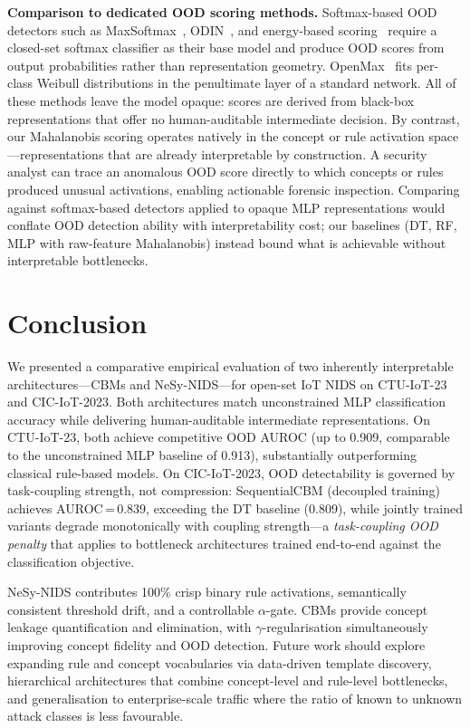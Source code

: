 \documentclass[journal]{IEEEtran}
\begin{document}
\textbf{Comparison to dedicated OOD scoring methods.}
Softmax-based OOD detectors such as
MaxSoftmax~\cite{hendrycks2017baseline}, ODIN~\cite{liang2018odin}, and
energy-based scoring~\cite{liu2020energy} require a closed-set softmax
classifier as their base model and produce OOD scores from output
probabilities rather than representation geometry. OpenMax~\cite{bendale2016openmax}
fits per-class Weibull distributions in the penultimate layer of a
standard network. All of these methods leave the model opaque: scores
are derived from black-box representations that offer no human-auditable
intermediate decision. By contrast, our Mahalanobis scoring operates
natively in the concept or rule activation space---representations that
are already interpretable by construction. A security analyst can trace
an anomalous OOD score directly to which concepts or rules produced
unusual activations, enabling actionable forensic inspection. Comparing
against softmax-based detectors applied to opaque MLP representations
would conflate OOD detection ability with interpretability cost; our
baselines (DT, RF, MLP with raw-feature Mahalanobis) instead bound
what is achievable without interpretable bottlenecks.

\section{Conclusion}

We presented a comparative empirical evaluation of two inherently
interpretable architectures---CBMs and NeSy-NIDS---for open-set IoT
NIDS on CTU-IoT-23 and CIC-IoT-2023. Both architectures match
unconstrained MLP classification accuracy while delivering
human-auditable intermediate representations. On CTU-IoT-23, both
achieve competitive OOD AUROC (up to 0.909, comparable to the
unconstrained MLP baseline of 0.913), substantially
outperforming classical rule-based models. On CIC-IoT-2023, OOD detectability is governed by task-coupling
strength, not compression: SequentialCBM (decoupled training) achieves
AUROC\,=\,0.839, exceeding the DT baseline (0.809), while jointly
trained variants degrade monotonically with coupling strength---a
\emph{task-coupling OOD penalty} that applies to bottleneck
architectures trained end-to-end against the classification objective.

NeSy-NIDS contributes 100\% crisp binary rule activations,
semantically consistent threshold drift, and a controllable
$\alpha$-gate. CBMs provide concept leakage quantification and
elimination, with $\gamma$-regularisation simultaneously improving
concept fidelity and OOD detection. Future work should explore
expanding rule and concept vocabularies via data-driven template
discovery, hierarchical architectures that combine concept-level and
rule-level bottlenecks, and generalisation to enterprise-scale traffic
where the ratio of known to unknown attack classes is less favourable.
\end{document}
